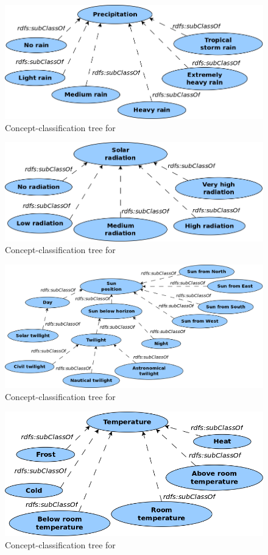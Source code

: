 \begin{figure}
  \centering
  \includegraphics[width=.8\textwidth]{figures/diagrams/precipitation.png}
  \caption{Concept-classification tree for }
  \label{fig:tree_precipitation}
\end{figure}

\begin{figure}
  \centering
  \includegraphics[width=.8\textwidth]{figures/diagrams/solar-radiation.png}
  \caption{Concept-classification tree for }
  \label{fig:tree_solar_radiation}
\end{figure}

\begin{figure}
  \centering
  \includegraphics[width=.8\textwidth]{figures/diagrams/sun-position.png}
  \caption{Concept-classification tree for }
  \label{fig:tree_sun_position}
\end{figure}

\begin{figure}
  \centering
  \includegraphics[width=.8\textwidth]{figures/diagrams/temperature.png}
  \caption{Concept-classification tree for }
  \label{fig:tree_temperature}
\end{figure}

